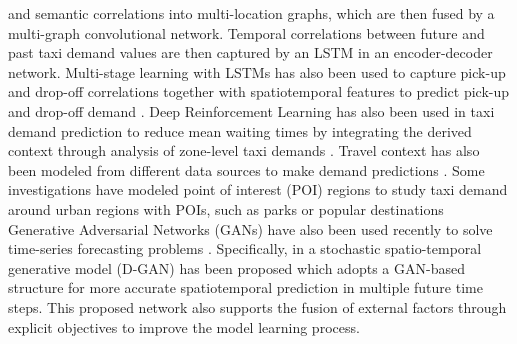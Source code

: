 \documentclass[conference]{IEEEtran}
\begin{document}
and semantic correlations into multi-location graphs, which are then fused by a multi-graph convolutional 
network. Temporal correlations between future and past taxi demand values are then captured by an LSTM in 
an encoder-decoder network. Multi-stage learning with LSTMs has also been used to capture pick-up and 
drop-off correlations together with spatiotemporal features to predict pick-up and drop-off
demand \cite{zhang_taxi_2022}. Deep Reinforcement Learning has also been used in taxi demand prediction
to reduce mean waiting times by integrating the derived context through analysis of zone-level taxi 
demands \cite{liu_context-aware_2022}. Travel context has also been modeled from different data sources 
to make demand predictions \cite{liu_contextualized_2019}. Some investigations have modeled point of interest (POI) 
regions to study taxi demand around urban regions with POIs, such as parks or popular destinations
\cite{cao_bert-based_2022}
\cite{askari_taxi_2020} Generative Adversarial Networks (GANs) have also been used recently to solve 
time-series forecasting problems \cite{goodfellow_generative_2014} \cite{jiang_forecasting_2019}. Specifically, 
in \cite{saxena_12d_2022} a stochastic spatio-temporal 
generative model (D-GAN) has been proposed which adopts a GAN-based structure for more accurate 
spatiotemporal prediction in multiple future time steps. This proposed network also supports the 
fusion of external factors through explicit objectives to improve the model learning process. 
\end{document}
